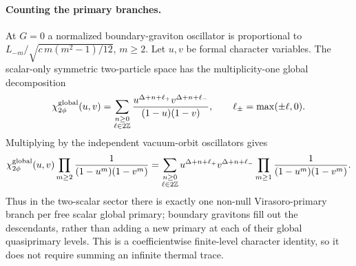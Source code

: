 \documentclass[11pt,a4paper]{article}
\numberwithin{equation}{section}
\theoremstyle{remark}\newtheorem{remark}[theorem]{Remark}
\begin{document}
\paragraph{Counting the primary branches.}
At $G=0$ a normalized boundary-graviton oscillator is proportional to
$L_{-m}/\sqrt{c\,m(m^2-1)/12}$, $m\geq2$. Let $u,v$ be formal character variables. The scalar-only symmetric two-particle space has the multiplicity-one global decomposition
\begin{equation}
 \chi_{2\phi}^{\rm global}(u,v)=
 \sum_{\substack{n\geq0\\\ell\in2\mathbb Z}}
 \frac{u^{\Delta+n+\ell_+}v^{\Delta+n+\ell_-}}{(1-u)(1-v)},
 \qquad \ell_\pm=\max(\pm\ell,0).
\end{equation}
Multiplying by the independent vacuum-orbit oscillators gives
\begin{align}
 \chi_{2\phi}^{\rm global}(u,v)
 \prod_{m\geq2}\frac1{(1-u^m)(1-v^m)}
 =\sum_{\substack{n\geq0\\\ell\in2\mathbb Z}}
 u^{\Delta+n+\ell_+}v^{\Delta+n+\ell_-}
 \prod_{m\geq1}\frac1{(1-u^m)(1-v^m)}.
 \label{eq:characterbranches}
\end{align}
Thus in the two-scalar sector there is exactly one non-null Virasoro-primary branch per free scalar global primary; boundary gravitons fill out the descendants, rather than adding a new primary at each of their global quasiprimary levels. This is a coefficientwise finite-level character identity, so it does not require summing an infinite thermal trace.
\end{document}
